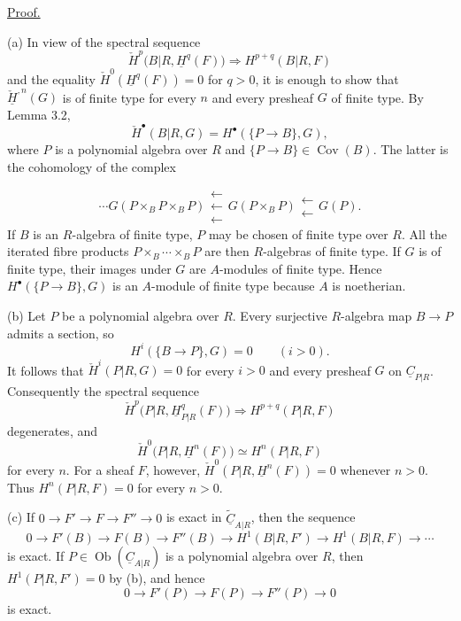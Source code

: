 \underline{Proof.}

(a) In view of the spectral sequence
\[
 \check H^p\bigl(B|R,\underline H^q(F)\bigr)
 \Longrightarrow H^{p+q}(B|R,F)
\]
and the equality
$\check H^0(\underline H^q(F))=0$ for $q>0$, it is enough to show
that $\check{\underline H}^{,n}(G)$ is of finite type for every
$n$ and every presheaf $G$ of finite type. By Lemma 3.2,
\[
 \check H^{\bullet}(B|R,G)=
 H^{\bullet}(\{P\longrightarrow B\},G),
\]
where $P$ is a polynomial algebra over $R$ and
$\{P\longrightarrow B\}\in\operatorname{Cov}(B)$. The latter is
the cohomology of the complex


\[
 \cdots
 G(P\times_BP\times_BP)
 \mathrel{\substack{\longleftarrow\\[-.6ex]\longleftarrow\\[-.6ex]\longleftarrow}}
 G(P\times_BP)
 \mathrel{\substack{\longleftarrow\\[-.6ex]\longleftarrow}}
 G(P).
\]
If $B$ is an $R$-algebra of finite type, $P$ may be chosen of
finite type over $R$. All the iterated fibre products
$P\times_B\cdots\times_BP$ are then $R$-algebras of finite type.
If $G$ is of finite type, their images under $G$ are $A$-modules of
finite type. Hence
$H^{\bullet}(\{P\longrightarrow B\},G)$ is an $A$-module of finite
type because $A$ is noetherian.

(b) Let $P$ be a polynomial algebra over $R$. Every surjective
$R$-algebra map $B\longrightarrow P$ admits a section, so
\[
 H^i(\{B\longrightarrow P\},G)=0\qquad(i>0).
\]
It follows that $\check H^i(P|R,G)=0$ for every $i>0$ and every
presheaf $G$ on $\underline C_{P|R}$. Consequently the spectral
sequence
\[
 \check H^p\bigl(P|R,\underline H^q_{P|R}(F)\bigr)
 \Longrightarrow H^{p+q}(P|R,F)
\]
degenerates, and
\[
 \check H^0\bigl(P|R,\underline H^n(F)\bigr)
 \simeq H^n(P|R,F)
\]
for every $n$. For a sheaf $F$, however,
$\check H^0(P|R,\underline H^n(F))=0$ whenever $n>0$. Thus
$H^n(P|R,F)=0$ for every $n>0$.

(c) If
$0\longrightarrow F'\longrightarrow F\longrightarrow F''
\longrightarrow0$ is exact in
$\widetilde{\underline C}_{A|R}$, then the sequence
\[
 0\longrightarrow F'(B)\longrightarrow F(B)
 \longrightarrow F''(B)
 \longrightarrow H^1(B|R,F')\longrightarrow H^1(B|R,F)
 \longrightarrow\cdots
\]
is exact. If $P\in\operatorname{Ob}(\underline C_{A|R})$ is a
polynomial algebra over $R$, then $H^1(P|R,F')=0$ by (b), and hence
\[
 0\longrightarrow F'(P)\longrightarrow F(P)
 \longrightarrow F''(P)\longrightarrow0
\]
is exact.

